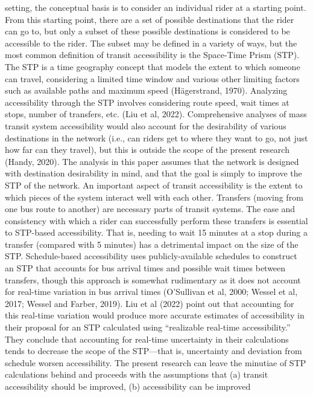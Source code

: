 \documentclass[
  12pt,
]{article}
\begin{document}
setting, the conceptual basis is to consider an individual rider at a
starting point. From this starting point, there are a set of possible
destinations that the rider can go to, but only a subset of these
possible destinations is considered to be accessible to the rider. The
subset may be defined in a variety of ways, but the most common
definition of transit accessibility is the Space-Time Prism (STP). The
STP is a time geography concept that models the extent to which someone
can travel, considering a limited time window and various other limiting
factors such as available paths and maximum speed (Hägerstrand, 1970).
Analyzing accessibility through the STP involves considering route
speed, wait times at stops, number of transfers, etc. (Liu et al, 2022).
Comprehensive analyses of mass transit system accessibility would also
account for the desirability of various destinations in the network
(i.e., can riders get to where they want to go, not just how far can
they travel), but this is outside the scope of the present research
(Handy, 2020). The analysis in this paper assumes that the network is
designed with destination desirability in mind, and that the goal is
simply to improve the STP of the network. An important aspect of transit
accessibility is the extent to which pieces of the system interact well
with each other. Transfers (moving from one bus route to another) are
necessary parts of transit systems. The ease and consistency with which
a rider can successfully perform these transfers is essential to
STP-based accessibility. That is, needing to wait 15 minutes at a stop
during a transfer (compared with 5 minutes) has a detrimental impact on
the size of the STP. Schedule-based accessibility uses
publicly-available schedules to construct an STP that accounts for bus
arrival times and possible wait times between transfers, though this
approach is somewhat rudimentary as it does not account for real-time
variation in bus arrival times (O'Sullivan et al, 2000; Wessel et al,
2017; Wessel and Farber, 2019). Liu et al (2022) point out that
accounting for this real-time variation would produce more accurate
estimates of accessibility in their proposal for an STP calculated using
``realizable real-time accessibility.'' They conclude that accounting
for real-time uncertainty in their calculations tends to decrease the
scope of the STP---that is, uncertainty and deviation from schedule
worsen accessibility. The present research can leave the minutiae of STP
calculations behind and proceeds with the assumptions that (a) transit
accessibility should be improved, (b) accessibility can be improved
\end{document}
